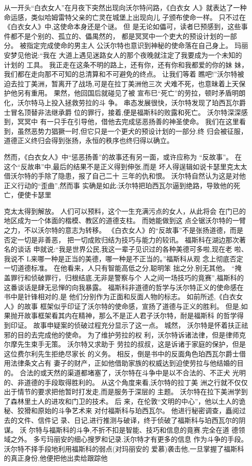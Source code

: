 \documentclass[a4paper]{article}
\begin{document}
从一开头“白衣女人”在月夜下突然出现向沃尔特问路，《白衣女
人》就表达了一种命运感，类似哈姆雷特父亲的亡灵在城堡上出现向儿
子颁布使命一样。 只不过在《白衣女人》中,这使命本身还是个谜。 但
是无论如儡可，读者巳预感到，这些事件都不是个别的、孤立的、儡禺然的，
都是冥冥中一个吏大的预设计划的一部分。 被指定完成使命的男主人
公沃尔特也意识到神秘的使命落在自己身上。 玛丽安梦见他说:“我在
大道上遇见迷路女人的那个夜晚就注定了我要成为一个未知的计划的
工具。 我正走在这条不明的路上，还有你，还有你和我都爱的你的妹
妹，我们都在走向那不可知的总清算和不可避免的终点。 让我们等着
瞧吧!”沃尔特被迫去拉丁美洲，暂离开了战场,可是在拉丁美洲他三次
犬难不死，也意昧着上天保护他另有重用。 果然，他回国后就碰见了被
宣布巳“死亡”的劳拉，顿时矛盾明朗化，沃尔特马上投入拯救劳拉的斗
争。 串态发展很快，沃尔特发现了珀西瓦尔爵士冒名顶替非法继承爵
位的罪行，接着,便是福斯科的败露和死亡。 沃尔特深深感到，冥冥中
有一只手在引导他，借他去完成惩恶扬善的神圣使命。 我们在这里看
到，虽然恶势力猖獗一时,但它只是一个更犬的预设计划的一部分.终
归会被征服，道德正义终归会得到张扬，永恒的秩序也终归得以确立。

然而，《白衣女人》中“惩恶扬善”的故事还有另一面，或许应称为
“反故事”。 在这个“反故串”中,最后的结果不是正义得到伸张,而是
坏人得逞辑如说卡瑟里克太太借沃尔特的手除了隐患，报了自己二十
三年的仇和恨。 沃尔特自然认为这是对他正义行动的“歪曲”,然而事
实确是如此:沃尔特把珀西瓦尔逼到绝路，导致他的死亡，便使卡瑟里

克太太得到解放。 人们可以预料，这个一生充满污点的女人，从此将会
在门已的地区成为一个体面的楷模、教区的道德支柱。 而她能做到这
点仝锯沃尔特的一臂之力，不以沃尔特的意志为转移。
《白衣女人》的“反故事”不是张扬道德，而是否定一切是非善恶，
把一切成败归结为技巧与能力的较讯。 福斯科在湖边那次著名的谈话
申就说:“我是世界公民,我这一辈子见识过的各种美德可多啦,现在老
啦、我说不 L来哪一种是正当的美德，哪一种是不正当的。”福斯科从观
念上彻底否定一切道德标准。 在他看来，人只有智能高低之分,聪明笨
拙之分.别无其他。 “掩盖罪行和侦破罪行，归根结底,无非是警察与个
人之间一场技巧的竟赛”,福斯科的这番谈话是肆无忌惮的向我暴露。
福斯科非道德的哲学与沃尔特正义的使命感在书中是针锋相对的,是
他们分别作为正面和反面人物的标志。 如前所述,《白衣女人》的故事
框架似乎印证了沃尔特的使命感，宣扬了道德与正义的胜利。 但是,如
果抛开故事框架看其内在精神，那么不是正人君子沃尔特，耐是福斯科
的哲学得到印证。 故事申疑案的侦破过程充分显示了这一点。 城然，
沃尔特是怀着扶正祛邪的目的去完成他的使命。 为了维护劳拉的权
利，沃尔特诉诸法律，但是律师克尔摩先生束手无策。 沃尔特又求助于
劳拉的叔叔，这是诉诸于家庭的保护，但是这位费尔利先生拒绝尽家长
的义务。 相反，倒是书中的反面角色珀西瓦尔爵士借用法律条文占有
妻子的财产，正如他借助家族的权威达到迫使劳拉与他结婚的目的。
合法的或天然的渠道都堵塞了，沃尔特在斗争中是以不合法的、不正犬
光明的、非道德的手段取得胜利的。 从这个角度来看,沃尔特的拉丁美
洲之行就不仅仅出于情节的要求把他暂时打发走,而是服务于深层的
主题。 沃尔特在拉下美洲学到了森林里土人的进攻和门卫的技术。 后
来，在伦敦“文明的中心”，他以土人的诡秘、狡猾和原始的斗争艺术来
对付福斯科与珀西瓦尔。 他进行秘密调查，矗阅过去的文件、信件记
录、日记,进行推测与破译，终于侦破了福斯科与珀西瓦尔的阴谋。 沃
尔特与福斯科的斗争,不折不扣是智能、技巧和信息的竟赛.完全在道
德领域之外。 多亏玛丽安的细心搜罗和记录.沃尔特才有更多的信息
作为斗争的手段。 沃尔特不择手段地利用福斯科的弱点(对玛丽安的
爱慕)袭击他,一旦掌握了福斯科的真正身份,他便把他出卖给跟踪他
\end{document}
